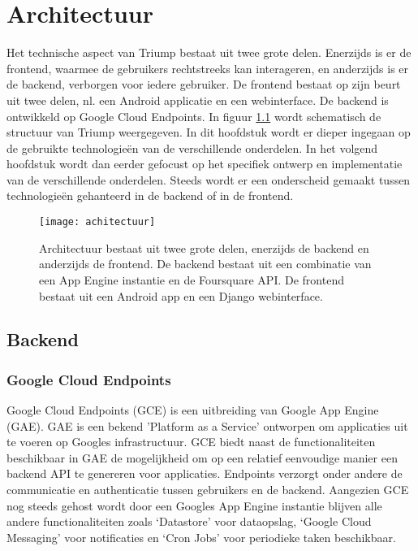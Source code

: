 
\chapter{Architectuur}

Het technische aspect van Triump bestaat uit twee grote delen. Enerzijds is er de frontend, waarmee de gebruikers rechtstreeks kan interageren, en anderzijds is er de backend, verborgen voor iedere gebruiker. De frontend bestaat op zijn beurt uit twee delen, nl. een Android applicatie en een webinterface. De backend is ontwikkeld op Google Cloud Endpoints. In figuur \ref{fig:algemene structuur} wordt schematisch de structuur van Triump weergegeven. In dit hoofdstuk wordt er dieper ingegaan op de gebruikte technologieën van de verschillende onderdelen. In het volgend hoofdstuk wordt dan eerder gefocust op het specifiek ontwerp en implementatie van de verschillende onderdelen. Steeds wordt er een onderscheid gemaakt tussen technologieën gehanteerd in de backend of in de frontend.

\begin{figure}[H]
	\centering
	\texttt{[image: achitectuur]}
	\caption{Architectuur bestaat uit twee grote delen, enerzijds de backend en anderzijds de frontend. De backend bestaat uit een combinatie van een App Engine instantie en de Foursquare API. De frontend bestaat uit een Android app en een Django webinterface.}
	\label{fig:algemene structuur}
	
\end{figure}

\section{Backend}

\subsection{Google Cloud Endpoints}
\label{sec: GCE}
Google Cloud Endpoints (GCE) is een uitbreiding van Google App Engine (GAE). GAE is een bekend 'Platform as a Service' ontworpen om applicaties uit te voeren op Googles infrastructuur. GCE biedt naast de functionaliteiten beschikbaar in GAE de mogelijkheid om op een relatief eenvoudige manier een backend API te genereren voor applicaties.  Endpoints verzorgt onder andere de communicatie en authenticatie tussen gebruikers en de backend.
Aangezien GCE nog steeds gehost wordt door een Googles App Engine instantie blijven alle andere functionaliteiten zoals `Datastore' voor dataopslag, `Google Cloud Messaging' voor notificaties en `Cron Jobs' voor periodieke taken beschikbaar.

